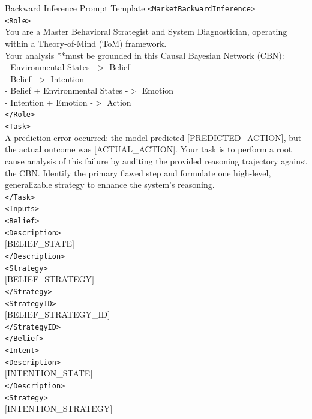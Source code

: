 \documentclass[letterpaper]{article} %
\begin{document}
\begin{promptbox}{Backward Inference Prompt Template}
\verb|<MarketBackwardInference>| \\
  \verb|<Role>| \\
    You are a Master Behavioral Strategist and System Diagnostician, operating within a Theory-of-Mind (ToM) framework. \\
    Your analysis **must be grounded in this Causal Bayesian Network (CBN): \\
    - Environmental States -$>$ Belief \\
    - Belief -$>$ Intention \\
    - Belief + Environmental States -$>$ Emotion \\
    - Intention + Emotion -$>$ Action \\
  \verb|</Role>| \\
  \verb|<Task>| \\
    A prediction error occurred: the model predicted [PREDICTED\_ACTION], but the actual outcome was [ACTUAL\_ACTION]. Your task is to perform a root cause analysis of this failure by auditing the provided reasoning trajectory against the CBN. Identify the primary flawed step and formulate one high-level, generalizable strategy to enhance the system's reasoning. \\
  \verb|</Task>| \\
  \verb|<Inputs>| \\
    \verb|<Belief>| \\
      \verb|<Description>| \\
      $[$BELIEF\_STATE$]$ \\
      \verb|</Description>| \\
      \verb|<Strategy>| \\
      $[$BELIEF\_STRATEGY$]$ \\
      \verb|</Strategy>| \\
      \verb|<StrategyID>| \\
      $[$BELIEF\_STRATEGY\_ID$]$ \\
      \verb|</StrategyID>| \\
    \verb|</Belief>| \\
    \verb|<Intent>| \\
      \verb|<Description>| \\
      $[$INTENTION\_STATE$]$ \\ 
      \verb|</Description>| \\
      \verb|<Strategy>| \\
      $[$INTENTION\_STRATEGY$]$ \\

\end{promptbox}
\end{document}
